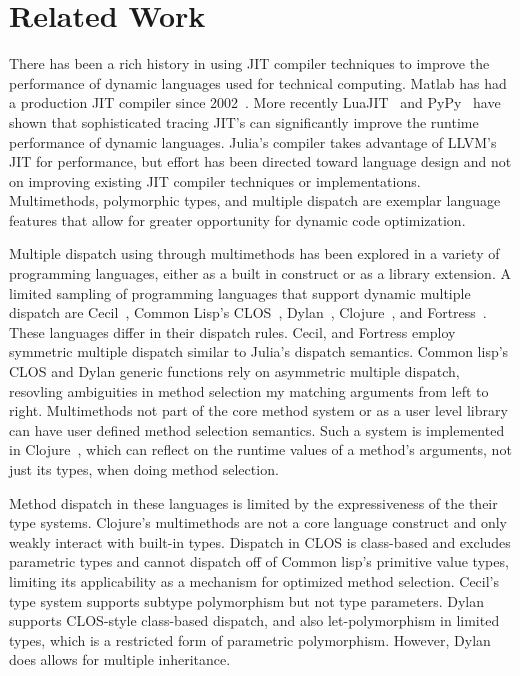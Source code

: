 \section{Related Work}

There has been a rich history in using JIT compiler techniques to improve the performance of dynamic languages used for technical computing. 
Matlab has had a production JIT compiler since 2002~\cite{matlab2002matlab}.
More recently LuaJIT~\cite{pall2008luajit} and PyPy~\cite{Bolz2009} have shown that sophisticated tracing JIT's can significantly improve the runtime performance of dynamic languages.
Julia's compiler takes advantage of LLVM's JIT for performance, but effort has been directed toward language design and not on improving existing JIT compiler techniques or implementations.
Multimethods, polymorphic types, and multiple dispatch are exemplar language features that allow for greater opportunity for dynamic code optimization.

Multiple dispatch using through multimethods has been explored in a variety of programming languages, either as a built in construct or as a library extension.
A limited sampling of programming languages that support dynamic multiple dispatch are Cecil~\cite{Chambers1992,Chambers1994}, Common Lisp's CLOS~\cite{Bobrow1988}, Dylan~\cite{dylanman}, Clojure~\cite{Hickey2008}, and Fortress~\cite{Allen2011}.
These languages differ in their dispatch rules.  
Cecil, and Fortress employ symmetric multiple dispatch similar to Julia's dispatch semantics.
Common lisp's CLOS and Dylan generic functions rely on asymmetric multiple dispatch, resovling ambiguities in method selection my matching arguments from left to right.
Multimethods not part of the core method system or as a user level library can have user defined method selection semantics.
Such a system is implemented in Clojure~\cite{Hickey2008}, which can reflect on the runtime values of a method's arguments, not just its types, when doing method selection.

Method dispatch in these languages is limited by the expressiveness of the their type systems.
Clojure's multimethods are not a core language construct and only weakly interact with built-in types.
Dispatch in CLOS is class-based and excludes parametric types and cannot dispatch off of Common lisp's primitive value types, limiting its applicability as a mechanism for optimized method selection.  
Cecil's type system supports subtype polymorphism but not type parameters.
Dylan supports CLOS-style class-based dispatch, and also let-polymorphism in limited types, which is a restricted form of parametric polymorphism.
However, Dylan does allows for multiple inheritance. 

